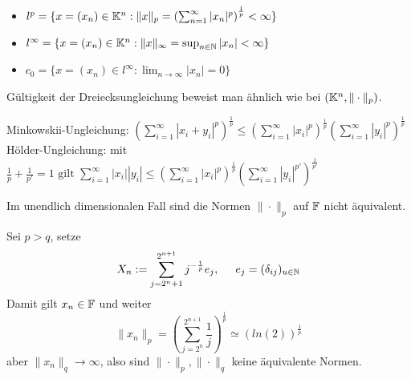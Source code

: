 \begin{beispiel}   
	\begin{itemize}
		\item $l^{p} = \{ x = (x_{n}) \in \mathbb{K}^n: \|x\|_{p} = \left( \sum_{n = 1}^{\infty} | x_{n} |^{p}\right)^{\frac{1}{p}} < \infty \}$
		\item $l^{\infty} = \{ x = (x_{n}) \in \mathbb{K}^n: \|x\|_{\infty} = \sup_{n \in \mathbb{N}} |x_{n}| < \infty \}$
		\item $c_{0} = \{ x = (x_{n}) \in l^{\infty}: \lim_{n \rightarrow \infty} |x_{n}| = 0 \}$
	\end{itemize}
Gültigkeit der Dreiecksungleichung beweist man ähnlich wie bei $(\mathbb{K}^{n}, \| \cdot \|_{p})$.
\end{beispiel}

\begin{lemma}  
Minkowskii-Ungleichung: $\left( \sum_{i=1}^{\infty} |x_{i} + y_{i}|^p\right)^{\frac{1}{p}} \leq\left( \sum_{i=1}^{\infty} |x_{i}|^p\right)^{\frac{1}{p}} \left( \sum_{i=1}^{\infty} |y_{i}|^p\right)^{\frac{1}{p}} $	\\
Hölder-Ungleichung: mit $\frac{1}{p} + \frac{1}{p'} = 1 \text{ gilt } \sum_{i=1}^{\infty} |x_{i}| |y_{i}| \leq \left( \sum_{i=1}^{\infty} |x_{i}|^{p} \right)^{\frac{1}{p}} \left( \sum_{i=1}^{\infty} |y_{i}|^{p'} \right)^{\frac{1}{p'}} $	\\	
\end{lemma}

\begin{bemerkung}
	Im unendlich dimensionalen Fall sind die Normen $\| \cdot \|_{p}$ auf $\mathbb{F}$ nicht äquivalent.
	\begin{beweis}
		Sei $p > q$, setze 
		\[ X_{n} := \sum_{j = 2^{n} + 1}^{2^{n + 1}} j^{-\frac{1}{p}}e_{j}, \hspace{0.5cm} e_{j} = ( \delta_{ij} )_{u \in \mathbb{N}} \]
		Damit gilt $x_{n} \in \mathbb{F}$ und weiter
		\[ \| x_{n} \|_{p} = \left( \sum_{j = 2^{n}}^{2^{n + 1}} \frac{1}{j} \right)^{\frac{1}{p}} \simeq \left( ln(2) \right)^{\frac{1}{p}} \]
		aber $\| x_{n} \|_{q} \rightarrow \infty$, also sind $\| \cdot \|_{p}, \| \cdot \|_{q}$ keine äquivalente Normen.
	\end{beweis}	
\end{bemerkung}



